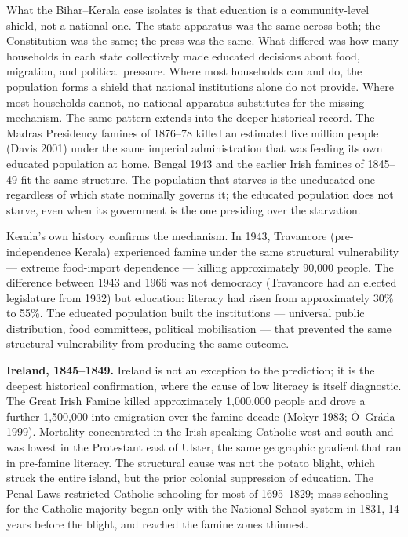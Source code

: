 \documentclass[12pt,letterpaper]{article}
\begin{document}
What the Bihar--Kerala case isolates is that education is a
community-level shield, not a national one. The state apparatus was
the same across both; the Constitution was the same; the press was
the same. What differed was how many households in each state
collectively made educated decisions about food, migration, and
political pressure. Where most households can and do, the population
forms a shield that national institutions alone do not provide. Where
most households cannot, no national apparatus substitutes for the
missing mechanism. The same pattern extends into the deeper
historical record. The Madras Presidency famines of 1876--78 killed
an estimated five million people (Davis 2001) under the same imperial
administration that was feeding its own educated population at home.
Bengal 1943 and the earlier Irish famines of 1845--49 fit the same
structure. The population that starves is the uneducated one
regardless of which state nominally governs it; the educated
population does not starve, even when its government is the one
presiding over the starvation.

Kerala's own history confirms the mechanism. In 1943, Travancore (pre-independence Kerala) experienced famine under the same structural vulnerability --- extreme food-import dependence --- killing approximately 90,000 people. The difference between 1943 and 1966 was not democracy (Travancore had an elected legislature from 1932) but education: literacy had risen from approximately 30\% to 55\%. The educated population built the institutions --- universal public distribution, food committees, political mobilisation --- that prevented the same structural vulnerability from producing the same outcome.

\textbf{Ireland, 1845--1849.} Ireland is not an exception to the
prediction; it is the deepest historical confirmation, where the
cause of low literacy is itself diagnostic. The Great Irish Famine
killed approximately 1,000,000 people and drove a further 1,500,000
into emigration over the famine decade (Mokyr 1983;
Ó~Gráda 1999). Mortality concentrated in the Irish-speaking Catholic
west and south and was lowest in the Protestant east of Ulster, the
same geographic gradient that ran in pre-famine literacy. The
structural cause was not the potato blight, which struck the entire
island, but the prior colonial suppression of education. The Penal
Laws restricted Catholic schooling for most of 1695--1829; mass
schooling for the Catholic majority began only with the National
School system in 1831, 14 years before the blight, and reached
the famine zones thinnest.
\end{document}
